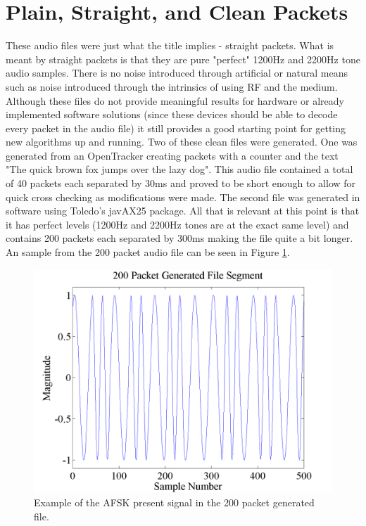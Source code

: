 \section{Plain, Straight, and Clean Packets}
These audio files were just what the title implies - straight packets. What is meant by straight packets is that they are pure "perfect" 1200Hz and 2200Hz tone audio samples. There is no noise introduced through artificial or natural means such as noise introduced through the intrinsics of using RF and the medium. Although these files do not provide meaningful results for hardware or already implemented software solutions (since these devices should be able to decode every packet in the audio file) it still provides a good starting point for getting new algorithms up and running. Two of these clean files were generated. One was generated from an OpenTracker creating packets with a counter and the text "The quick brown fox jumps over the lazy dog". This audio file contained a total of 40 packets each separated by 30ms and proved to be short enough to allow for quick cross checking as modifications were made. The second file was generated in software using Toledo's javAX25 package. All that is relevant at this point is that it has perfect levels (1200Hz and 2200Hz tones are at the exact same level) and contains 200 packets each separated by 300ms making the file quite a bit longer. An sample from the 200 packet audio file can be seen in Figure \ref{gen200Segment}.
\begin{figure}
  \centering
	\includegraphics[width=0.75\linewidth]{images/200PacketGeneratedFileSegment.png} 
	\caption{Example of the AFSK present signal in the 200 packet generated file.}
   \label{gen200Segment}
\end{figure}

